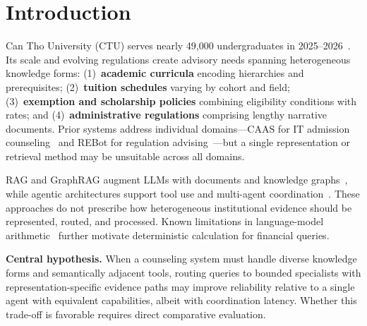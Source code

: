 \section{Introduction}
\label{sec:intro}

Can Tho University (CTU) serves nearly 49,000 undergraduates in 2025--2026~\cite{ctu2025opening}. Its scale and evolving regulations create advisory needs spanning heterogeneous knowledge forms: (1)~\textbf{academic curricula} encoding hierarchies and prerequisites; (2)~\textbf{tuition schedules} varying by cohort and field; (3)~\textbf{exemption and scholarship policies} combining eligibility conditions with rates; and (4)~\textbf{administrative regulations} comprising lengthy narrative documents. Prior systems address individual domains---CAAS for IT admission counseling~\cite{ma2023caas} and REBot for regulation advising~\cite{ma2025rebot}---but a single representation or retrieval method may be unsuitable across all domains.

RAG and GraphRAG augment LLMs with documents and knowledge graphs~\cite{lewis2020rag,gao2023rag_survey,edge2024graphrag}, while agentic architectures support tool use and multi-agent coordination~\cite{yao2023react,wu2023autogen,schick2023toolformer}. These approaches do not prescribe how heterogeneous institutional evidence should be represented, routed, and processed. Known limitations in language-model arithmetic~\cite{qian2023limitations} further motivate deterministic calculation for financial queries.

\textbf{Central hypothesis.}
When a counseling system must handle diverse knowledge forms and semantically adjacent tools, routing queries to bounded specialists with representation-specific evidence paths may improve reliability relative to a single agent with equivalent capabilities, albeit with coordination latency. Whether this trade-off is favorable requires direct comparative evaluation.

